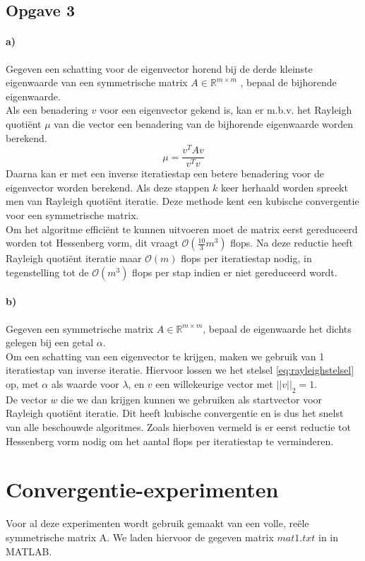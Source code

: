 \documentclass[a4paper, 12pt, titlepage]{report}
\begin{document}
\subsection{Opgave 3}
\paragraph{a)}
Gegeven een schatting voor de eigenvector horend bij de derde kleinste eigenwaarde van een symmetrische matrix $A \in \mathbb{R}^{m \times m}$ , bepaal de bijhorende eigenwaarde.\\
Als een benadering $v$ voor een eigenvector gekend is, kan er m.b.v. het Rayleigh quoti\"ent $\mu$ van die vector een benadering van de bijhorende eigenwaarde worden berekend.
\begin{equation}
	\mu = \frac{v^TAv}{v^Tv}
	\label{eqn:rayleighquotient}
\end{equation}
Daarna kan er met een inverse iteratiestap een betere benadering voor de eigenvector worden berekend. Als deze stappen $k$ keer herhaald worden spreekt men van Rayleigh quoti\"ent iteratie. Deze methode kent een kubische convergentie voor een symmetrische matrix. \\
Om het algoritme effici\"ent te kunnen uitvoeren moet de matrix eerst gereduceerd worden tot Hessenberg vorm, dit vraagt $\mathcal{O}(\frac{10}{3}m^3)$ flops. Na deze reductie heeft Rayleigh quoti\"ent iteratie maar $\mathcal{O}(m)$ flops per iteratiestap nodig, in tegenstelling tot de $\mathcal{O}(m^3)$ flops per stap indien er niet gereduceerd wordt. 
\paragraph{b)}
Gegeven een symmetrische matrix $A \in \mathbb{R}^{m \times m}$, bepaal de eigenwaarde het dichts gelegen bij een getal $\alpha$.\\
Om een schatting van een eigenvector te krijgen, maken we gebruik van 1 iteratiestap van inverse iteratie. Hiervoor lossen we het stelsel \eqref{eq:rayleighstelsel} op, met $\alpha$ als waarde voor $\lambda$, en $v$ een willekeurige vector met $||v||_2 = 1$.\\ 
De vector $w$ die we dan krijgen kunnen we gebruiken als startvector voor Rayleigh quoti\"ent iteratie. Dit heeft kubische convergentie en is dus het snelst van alle beschouwde algoritmes. Zoals hierboven vermeld is er eerst reductie tot Hessenberg vorm nodig om het aantal flops per iteratiestap te verminderen. 
\section{Convergentie-experimenten}
Voor al deze experimenten wordt gebruik gemaakt van een volle, re\"ele symmetrische matrix A. We laden hiervoor de gegeven matrix $mat1.txt$ in in MATLAB.
\end{document}
